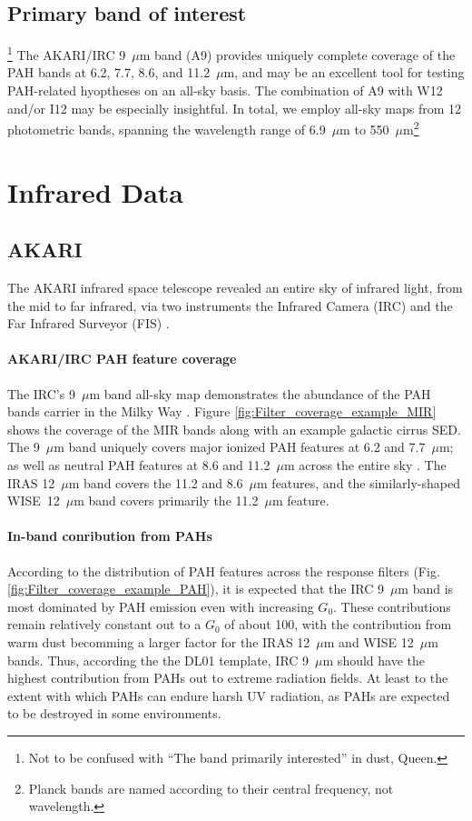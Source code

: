   \subsection{Primary band of interest}\footnote{Not to be confused with ``The band primarily interested'' in dust, Queen.}
    The AKARI/IRC 9~$\mu$m band (A9) provides uniquely complete coverage of the PAH bands at 6.2, 7.7, 8.6, and 11.2~$\mu$m, and may be an excellent tool for testing PAH-related hyoptheses on an all-sky basis. The combination of A9 with W12 and/or I12 may be especially insightful. In total, we employ all-sky maps from 12 photometric bands, spanning the wavelength range of 6.9~$\mu$m to 550~$\mu$m\footnote{Planck bands are named according to their central frequency, not wavelength.}

  \section{Infrared Data}
    \subsection{AKARI}
       The AKARI infrared space telescope revealed an entire sky of infrared light, from the mid to far infrared, via two instruments \citep{akari07} the Infrared Camera (IRC)\citep{irc07} and the Far Infrared Surveyor (FIS) \citep{fis07}.

       \paragraph{AKARI/IRC PAH feature coverage}
         The IRC's 9~$\mu$m band all-sky map demonstrates the abundance of the PAH bands carrier in the Milky Way \citep{ishihara10}. Figure \ref{fig:Filter_coverage_example_MIR} shows the coverage of the MIR bands along with an example galactic cirrus SED. The 9~$\mu$m band uniquely covers major ionized PAH features at 6.2 and 7.7~$\mu$m; as well as neutral PAH features at 8.6 and 11.2~$\mu$m across the entire sky \citep{irc07}. The IRAS 12~$\mu$m band covers the 11.2 and 8.6~$\mu$m features, and the similarly-shaped WISE~12~$\mu$m band covers primarily the 11.2~$\mu$m feature.

         \paragraph{In-band conribution from PAHs}
           According to the distribution of PAH features across the response filters (Fig. \ref{fig:Filter_coverage_example_PAH}), it is expected that the IRC 9~$\mu{}$m band is most dominated by PAH emission even with increasing $G_0$. These contributions remain relatively constant out to a $G_{0}$ of about 100, with the contribution from warm dust becomming a larger factor for the IRAS 12~$\mu$m and WISE 12~$\mu$m bands. Thus, according the the DL01 template, IRC 9~$\mu$m should have the highest contribution from PAHs out to extreme radiation fields. At least to the extent with which PAHs can endure harsh UV radiation, as PAHs are expected to be destroyed in some environments\cite{pilleri12, pavlyuchenkov13, }.

